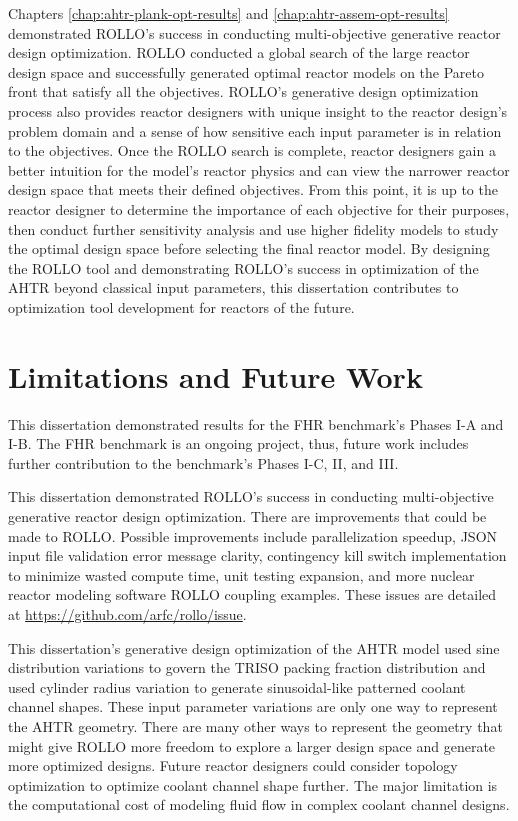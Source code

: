Chapters \ref{chap:ahtr-plank-opt-results} and \ref{chap:ahtr-assem-opt-results} 
demonstrated \gls{ROLLO}'s success in conducting multi-objective generative reactor 
design optimization. 
\gls{ROLLO} conducted a global search of the large reactor design space and successfully 
generated optimal reactor models on the Pareto front that satisfy all the objectives. 
\gls{ROLLO}'s generative design optimization process also provides reactor designers 
with unique insight to the reactor design's problem domain and a sense of how 
sensitive each input parameter is in relation to the objectives. 
Once the \gls{ROLLO} search is complete, reactor designers gain a better intuition for 
the model's reactor physics and can view the narrower reactor design space that meets 
their defined objectives.   
From this point, it is up to the reactor designer to determine the importance of each 
objective for their purposes, then conduct further sensitivity analysis and 
use higher fidelity models to study the optimal design space before selecting 
the final reactor model.
By designing the \gls{ROLLO} tool and demonstrating \gls{ROLLO}'s success in 
optimization of the \gls{AHTR} beyond classical input parameters, this dissertation 
contributes to optimization tool development for reactors of the future. 

\section{Limitations and Future Work}
This dissertation demonstrated results for the \gls{FHR} benchmark's Phases I-A and I-B.
The \gls{FHR} benchmark is an ongoing project, thus, future work includes further 
contribution to the benchmark's Phases I-C, II, and III. 

This dissertation demonstrated \gls{ROLLO}'s success in conducting multi-objective 
generative reactor design optimization. 
There are improvements that could be made to \gls{ROLLO}. 
Possible improvements include parallelization speedup, JSON input file validation error 
message clarity, contingency kill switch implementation to minimize wasted compute time, 
unit testing expansion, and more nuclear reactor modeling software \gls{ROLLO} coupling 
examples.  
These issues are detailed at 
\hyperlink{https://github.com/arfc/rollo/issue}{https://github.com/arfc/rollo/issue}.

This dissertation's generative design optimization of the \gls{AHTR} model used sine 
distribution variations to govern the \gls{TRISO} packing fraction distribution and  
used cylinder radius variation to generate sinusoidal-like patterned coolant channel 
shapes. 
These input parameter variations are only one way to represent the \gls{AHTR} 
geometry. 
There are many other ways to represent the geometry that might give \gls{ROLLO} more 
freedom to explore a larger design space and generate more optimized designs. 
Future reactor designers could consider topology optimization to optimize coolant 
channel shape further.
The major limitation is the computational cost of modeling fluid flow in complex 
coolant channel designs. 

